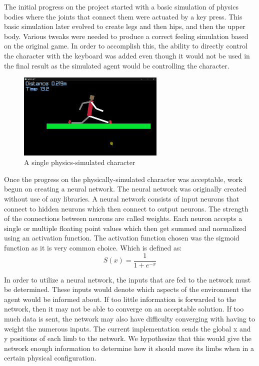 \documentclass[letterpaper]{article} %
\begin{document}
\par The initial progress on the project started with a basic simulation of physics bodies where the joints that connect them were actuated by a key press. This basic simulation later evolved to create legs and then hips, and then the upper body. Various tweaks were needed to produce a correct feeling simulation based on the original game. In order to accomplish this, the ability to directly control the character with the keyboard was added even though it would not be used in the final result as the simulated agent would be controlling the character. 

\begin{figure}[h]
\caption{A single physics-simulated character}
\centering
\includegraphics[width=7cm]{character.png}
\end{figure}

\par Once the progress on the physically-simulated character was acceptable, work begun on creating a neural network. The neural network was originally created without use of any libraries. A neural network consists of input neurons that connect to hidden neurons which then connect to output neurons. The strength of the connections between neurons are called weights. Each neuron accepts a single or multiple floating point values which then get summed and normalized using an activation function. The activation function chosen was the sigmoid function as it is very common choice. Which is defined as:
$$
S(x)=\frac{1}{1+e^{-x}}
$$
\par In order to utilize a neural network, the inputs that are fed to the network must be determined. These inputs would denote which aspects of the environment the agent would be informed about. If too little information is forwarded to the network, then it may not be able to converge on an acceptable solution. If too much data is sent, the network may also have difficulty converging with having to weight the numerous inputs. The current implementation sends the global x and y positions of each limb to the network. We hypothesize that this would give the network enough information to determine how it should move its limbs when in a certain physical configuration.
\end{document}
